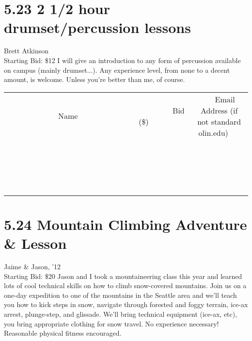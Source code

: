 \documentclass[11pt]{article}
\begin{document}
\section*{5.23 2 1/2 hour drumset/percussion lessons}
Brett Atkinson
\\
Starting Bid: \$12
\newline
I will give an introduction to any form of percussion available on campus (mainly drumset...). Any experience level, from none to a decent amount, is welcome. Unless you're better than me, of course.
\\[3ex]
\begin{tabular}{c c c}
~~~~~~~~~~~~~Name~~~~~~~~~~~~~ & ~~~~~~~~~Bid (\$)~~~~~~~~~  & ~~~Email Address (if not standard olin.edu)~~~\\
 & & \\
\hline
 & & \\
\hline
 & & \\
\hline
 & & \\
\hline
 & & \\
\hline
 & & \\
\hline
 & & \\
\hline
 & & \\
\hline
 & & \\
\hline
 & & \\
\hline
 & & \\
\hline
 & & \\
\hline
 & & \\
\hline
 & & \\
\hline
 & & \\
\hline
 & & \\
\hline
 & & \\
\hline
 & & \\
\hline
 & & \\
\hline
\end{tabular}
\newpage
\section*{5.24 Mountain Climbing Adventure \& Lesson}
Jaime \& Jason, '12
\\
Starting Bid: \$20
\newline
Jason and I took a mountaineering class this year and learned lots of cool technical skills on how to climb snow-covered mountains. Join us on a one-day expedition to one of the mountains in the Seattle area and we'll teach you how to kick steps in snow, navigate through forested and foggy terrain, ice-ax arrest, plunge-step, and glissade. We'll bring technical equipment (ice-ax, etc), you bring appropriate clothing for snow travel. No experience necessary! Reasonable physical fitness encouraged.
\end{document}
